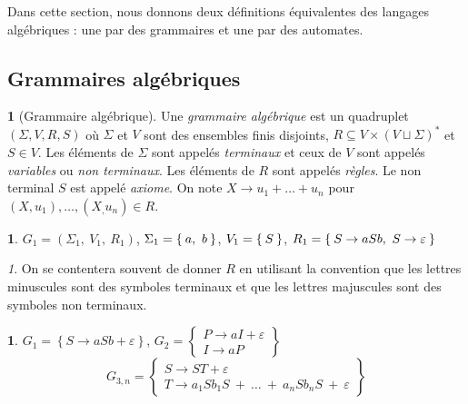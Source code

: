 \documentclass[11pt,a4paper]{article}
\theoremstyle{plain}
\theoremstyle{definition}
\newtheorem{defn}[thm]{\protect\definitionname}
\theoremstyle{definition}
\newtheorem{example}[thm]{\protect\examplename}
\theoremstyle{remark}
\theoremstyle{remark}
\newtheorem{rem}[thm]{\protect\remarkname}
\theoremstyle{plain}
\theoremstyle{plain}
\theoremstyle{plain}
\theoremstyle{remark}
\providecommand{\definitionname}{Définition}
\providecommand{\examplename}{Exemple}
\providecommand{\remarkname}{Remarque}
\begin{document}
Dans cette section, nous donnons deux définitions équivalentes des langages algébriques : une par des grammaires et une par des automates.

\subsection{Grammaires algébriques}


\begin{defn}[Grammaire algébrique]
	Une \emph{grammaire algébrique} est un quadruplet $(\Sigma, V, R, S)$ où $\Sigma$ et $V$ sont des ensembles finis disjoints, $R\subseteq V\times(V\sqcup\Sigma)^*$ et $S\in V$. Les éléments de $\Sigma$ sont appelés \emph{terminaux} et ceux de $V$ sont appelés \emph{variables} ou \emph{non terminaux}. Les éléments de $R$ sont appelés \emph{règles}. Le non terminal $S$ est appelé \emph{axiome}. On note $X\to u_1+\dots+u_n$ pour $(X,u_1),\dots,(X_,u_n)\in R$.
\end{defn}

\begin{example}
	$G_{1}=\left(\Sigma_{1},\ V_{1},\ R_{1}\right)$, $\Sigma_{1}=\Set{a,\ b}$,
	$V_{1}=\Set S$, $R_{1}=\Set{S\to aSb,\ S\to\varepsilon}$
\end{example}

\begin{rem}
	On se contentera souvent de donner $R$ en utilisant la convention
	que les lettres minuscules sont des symboles terminaux et que les
	lettres majuscules sont des symboles non terminaux.
\end{rem}

\begin{example}
	$G_{1}=\left\{ S\to aSb+\varepsilon\right\} $, $G_{2}=\left\{ \begin{array}{c}
	P\to aI+\varepsilon\\
	I\to aP
	\end{array}\right\} $
	$$G_{3,n}=\left\{ \begin{array}{c}
	S\to ST+\varepsilon\\
	T\to a_{1}Sb_{1}S\ +\ \dots\ +\ a_{n}Sb_{n}S\ +\ \varepsilon
	\end{array}\right\} $$
\end{example}
\end{document}
